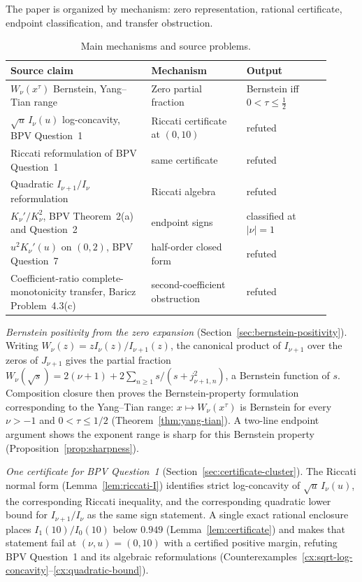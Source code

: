 \documentclass[preprint,12pt]{elsarticle}
\theoremstyle{plain}
\theoremstyle{definition}
\theoremstyle{remark}
\begin{document}
The paper is organized by mechanism: zero representation, rational certificate,
endpoint classification, and transfer obstruction.

\begin{table}[t]
\centering
\caption{Main mechanisms and source problems.}
\label{tab:mechanisms}
\footnotesize
\begin{tabular}{@{}>{\raggedright\arraybackslash}p{0.40\linewidth}
>{\raggedright\arraybackslash}p{0.27\linewidth}
>{\raggedright\arraybackslash}p{0.24\linewidth}@{}}
\hline
Source claim & Mechanism & Output \\
\hline
\(W_\nu(x^\tau)\) Bernstein, Yang--Tian range \cite{yang-tian} &
Zero partial fraction & Bernstein iff \(0<\tau\le\frac12\) \\
\(\sqrt u\,I_\nu(u)\) log-concavity, BPV Question~1 \cite{bpv} &
Riccati certificate at \((0,10)\) & refuted \\
Riccati reformulation of BPV Question~1 &
same certificate & refuted \\
Quadratic \(I_{\nu+1}/I_\nu\) reformulation &
Riccati algebra & refuted \\
\(K_\nu'/K_\nu^2\), BPV Theorem~2(a) and Question~2 \cite{bpv} &
endpoint signs & classified at \(|\nu|=1\) \\
\(u^2K_\nu'(u)\) on \((0,2)\), BPV Question~7 \cite{bpv} &
half-order closed form & refuted \\
Coefficient-ratio complete-monotonicity transfer, Baricz Problem~4.3(c) \cite{baricz-bounds} &
second-coefficient obstruction & refuted \\
\hline
\end{tabular}
\end{table}

\emph{Bernstein positivity from the zero expansion}
(Section~\ref{sec:bernstein-positivity}). Writing
\(W_\nu(z)=zI_\nu(z)/I_{\nu+1}(z)\), the canonical product of \(I_{\nu+1}\)
over the zeros of \(J_{\nu+1}\) gives the partial fraction
\(W_\nu(\sqrt s)=2(\nu+1)+2\sum_{n\ge1}s/(s+j_{\nu+1,n}^2)\), a Bernstein
function of \(s\). Composition closure then proves the Bernstein-property
formulation corresponding to the Yang--Tian range: \(x\mapsto W_\nu(x^\tau)\)
is Bernstein for every
\(\nu>-1\) and \(0<\tau\le1/2\)
(Theorem~\ref{thm:yang-tian}). A two-line endpoint argument shows the
exponent range is sharp for this Bernstein property
(Proposition~\ref{prop:sharpness}).

\emph{One certificate for BPV Question~1}
(Section~\ref{sec:certificate-cluster}). The Riccati normal form
(Lemma~\ref{lem:riccati-I}) identifies strict log-concavity of
\(\sqrt u\,I_\nu(u)\), the corresponding Riccati inequality, and the
corresponding quadratic lower bound for \(I_{\nu+1}/I_\nu\) as the same sign
statement. A single exact rational enclosure places \(I_1(10)/I_0(10)\)
below \(0.949\) (Lemma~\ref{lem:certificate}) and makes that statement fail
at \((\nu,u)=(0,10)\) with a certified positive margin, refuting
BPV Question~1 and its algebraic reformulations
(Counterexamples~\ref{cx:sqrt-log-concavity}--\ref{cx:quadratic-bound}).
\end{document}
